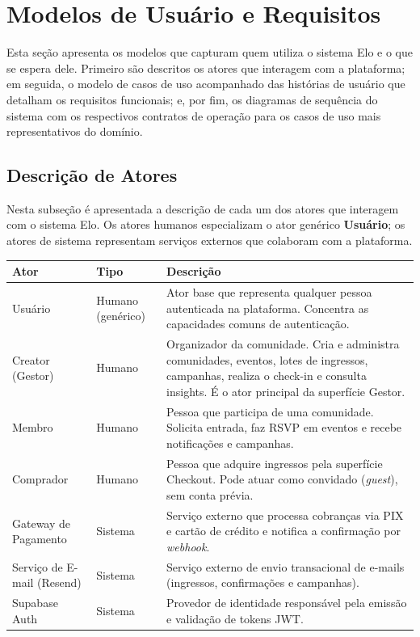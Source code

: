 \documentclass[12pt, a4paper]{article}
\begin{document}
\section{Modelos de Usuário e Requisitos}

Esta seção apresenta os modelos que capturam quem utiliza o sistema Elo e o que
se espera dele. Primeiro são descritos os atores que interagem com a plataforma;
em seguida, o modelo de casos de uso acompanhado das histórias de usuário que
detalham os requisitos funcionais; e, por fim, os diagramas de sequência do
sistema com os respectivos contratos de operação para os casos de uso mais
representativos do domínio.

\subsection{Descrição de Atores}

Nesta subseção é apresentada a descrição de cada um dos atores que interagem
com o sistema Elo. Os atores humanos especializam o ator genérico
\textbf{Usuário}; os atores de sistema representam serviços externos que
colaboram com a plataforma.

\vspace{4pt}
\begin{tabularx}{\textwidth}{|L{3.2cm}|L{2.4cm}|X|}
  \hline
  \textbf{Ator} & \textbf{Tipo} & \textbf{Descrição} \\
  \hline
  Usuário & Humano (genérico) & Ator base que representa qualquer pessoa autenticada na plataforma. Concentra as capacidades comuns de autenticação. \\[2pt] \hline
  Creator (Gestor) & Humano & Organizador da comunidade. Cria e administra comunidades, eventos, lotes de ingressos, campanhas, realiza o check-in e consulta insights. É o ator principal da superfície Gestor. \\[2pt] \hline
  Membro & Humano & Pessoa que participa de uma comunidade. Solicita entrada, faz RSVP em eventos e recebe notificações e campanhas. \\[2pt] \hline
  Comprador & Humano & Pessoa que adquire ingressos pela superfície Checkout. Pode atuar como convidado (\textit{guest}), sem conta prévia. \\[2pt] \hline
  Gateway de Pagamento & Sistema & Serviço externo que processa cobranças via PIX e cartão de crédito e notifica a confirmação por \textit{webhook}. \\[2pt] \hline
  Serviço de E-mail (Resend) & Sistema & Serviço externo de envio transacional de e-mails (ingressos, confirmações e campanhas). \\[2pt] \hline
  Supabase Auth & Sistema & Provedor de identidade responsável pela emissão e validação de tokens JWT. \\[2pt] \hline
\end{tabularx}
\end{document}
